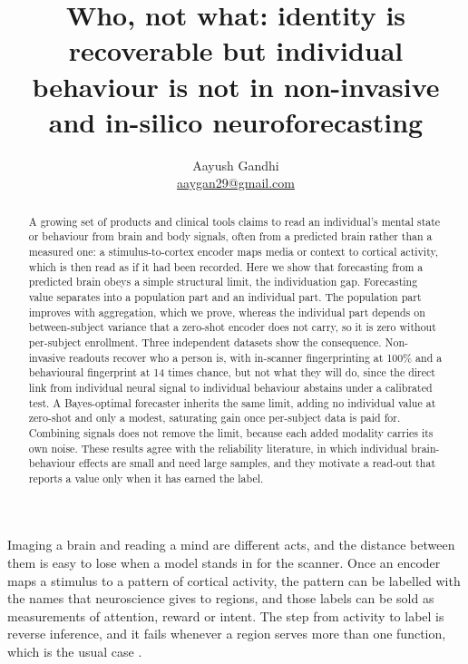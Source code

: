 \documentclass[11pt]{article}
\title{\vspace{-2.4em}\textbf{Who, not what: identity is recoverable but individual behaviour is not
in non-invasive and in-silico neuroforecasting}}
\author{Aayush Gandhi\\[-0.2em]\small \href{mailto:aaygan29@gmail.com}{aaygan29@gmail.com}}
\date{\vspace{-1.4em}}
\begin{document}
\maketitle

\begin{abstract}
\noindent
A growing set of products and clinical tools claims to read an individual's mental state or behaviour
from brain and body signals, often from a predicted brain rather than a measured one: a
stimulus-to-cortex encoder maps media or context to cortical activity, which is then read as if it had
been recorded. Here we show that forecasting from a predicted brain obeys a simple structural limit, the
individuation gap. Forecasting value separates into a population part and an individual part. The
population part improves with aggregation, which we prove, whereas the individual part depends on
between-subject variance that a zero-shot encoder does not carry, so it is zero without per-subject
enrollment. Three independent datasets show the consequence. Non-invasive readouts recover who a person
is, with in-scanner fingerprinting at 100\% and a behavioural fingerprint at 14 times chance, but not
what they will do, since the direct link from individual neural signal to individual behaviour abstains
under a calibrated test. A Bayes-optimal forecaster inherits the same limit, adding no individual value
at zero-shot and only a modest, saturating gain once per-subject data is paid for. Combining signals does
not remove the limit, because each added modality carries its own noise. These results agree with the
reliability literature, in which individual brain-behaviour effects are small and need large samples, and
they motivate a read-out that reports a value only when it has earned the label.
\end{abstract}

Imaging a brain and reading a mind are different acts, and the distance between them is easy to lose when
a model stands in for the scanner. Once an encoder maps a stimulus to a pattern of cortical activity, the
pattern can be labelled with the names that neuroscience gives to regions, and those labels can be sold as
measurements of attention, reward or intent. The step from activity to label is reverse inference, and it
fails whenever a region serves more than one function, which is the usual case \citep{poldrack2006,
hutzler2013}.
\end{document}
